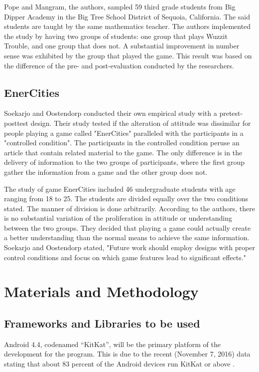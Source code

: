 \documentclass[journal]{./IEEE/IEEEtran}
\begin{document}
Pope and Mangram, the authors, sampled 59 third grade students from Big Dipper Academy in the Big Tree School District of Sequoia, California. The said students are taught by the same mathematics teacher. The authors implemented the study by having two groups of students: one group that plays Wuzzit Trouble, and one group that does not. A substantial improvement in number sense was exhibited by the group that played the game. This result was based on the difference of the pre- and post-evaluation conducted by the researchers.

\subsection{EnerCities \cite{soekarjo2015measuring}}
Soekarjo and Oostendorp conducted their own empirical study with a pretest-posttest design. Their study tested if the alteration of attitude was dissimilar for people playing a game called "EnerCities" paralleled with the participants in a "controlled condition". The participants in the controlled condition peruse an article that contain related material to the game. The only difference is in the delivery of information to the two groups of participants, where the first group gather the information from a game and the other group does not.

The study of game EnerCities included 46 undergraduate students with age ranging from 18 to 25. The students are divided equally over the two conditions stated. The manner of division is done arbitrarily. According to the authors, there is no substantial variation of the proliferation in attitude or understanding between the two groups. They decided that playing a game could actually create a better understanding than the normal means to achieve the same information. Soekarjo and Oostendorp stated, "Future work should employ designs with proper control conditions and focus on which game features lead to significant effects."
\\

\section{Materials and Methodology}
\subsection{Frameworks and Libraries to be used}
Android 4.4, codenamed “KitKat”, will be the primary platform of the development for the program. This is due to the recent (November 7, 2016) data stating that about 83 percent of the Android devices run KitKat or above \cite{google2016developers}.
\end{document}
